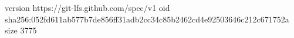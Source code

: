 version https://git-lfs.github.com/spec/v1
oid sha256:052fd611ab577b7de856ff31adb2cc34c85b2462cd4e92503646c212c671752a
size 3775
